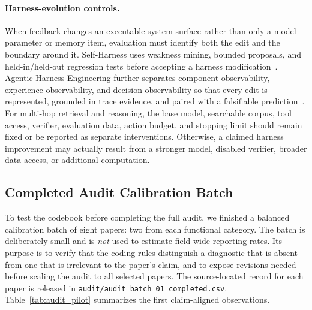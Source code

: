 \paragraph{Harness-evolution controls.}
When feedback changes an executable system surface rather than only a model parameter or memory item, evaluation must identify both the edit and the boundary around it. Self-Harness uses weakness mining, bounded proposals, and held-in/held-out regression tests before accepting a harness modification~\cite{zhang2026selfharness}. Agentic Harness Engineering further separates component observability, experience observability, and decision observability so that every edit is represented, grounded in trace evidence, and paired with a falsifiable prediction~\cite{lin2026ahe}. For multi-hop retrieval and reasoning, the base model, searchable corpus, tool access, verifier, evaluation data, action budget, and stopping limit should remain fixed or be reported as separate interventions. Otherwise, a claimed harness improvement may actually result from a stronger model, disabled verifier, broader data access, or additional computation.

\subsection{Completed Audit Calibration Batch}
\label{subsec:audit_pilot}

To test the codebook before completing the full audit, we finished a balanced calibration batch of eight papers: two from each functional category. The batch is deliberately small and is \emph{not} used to estimate field-wide reporting rates. Its purpose is to verify that the coding rules distinguish a diagnostic that is absent from one that is irrelevant to the paper's claim, and to expose revisions needed before scaling the audit to all \AuditSize{} selected papers. The source-located record for each paper is released in \texttt{audit/audit\_batch\_01\_completed.csv}. Table~\ref{tab:audit_pilot} summarizes the first claim-aligned observations.

